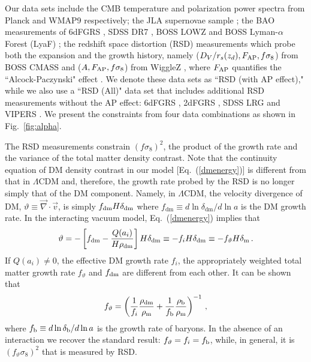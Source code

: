 \documentclass[prd,twocolumn,preprintnumbers,amsmath,amssymb,nofootinbib,english,showpacs]{revtex4-1}
\newcommand{\tc}{\textcolor{black}}
\def\be{\begin{equation}}
\def\ee{\end{equation}}
\begin{document}
Our data sets include the CMB temperature and polarization power spectra from Planck \cite{Planck:2013Mar:cos} and WMAP9 \cite{WMAP9:2012} respectively; the JLA supernovae sample \cite{Sako:2014Jan}; the BAO measurements of 6dFGRS \cite{Beutler:2011Jun}, SDSS DR7 \cite{Padmanabhan:2012Feb}, BOSS LOWZ \cite{Anderson:2013Dec} and BOSS Lyman-$\alpha$ Forest (LyaF) \cite{Aubourg:2014Nov}; the redshift space distortion (RSD) measurements which probe both the expansion and the growth history, namely ($D_V/r_s(z_d), F_{\rm AP}, f\sigma_8$) from BOSS CMASS \cite{Beutler:2013Dec} and ($A, F_{\rm AP}, f\sigma_8$) from WiggleZ \cite{Blake:2012Apr}, where $F_{\rm AP}$ quantifies the ``Alcock-Paczynski" effect \cite{AP}. We denote these data sets as ``RSD (with AP effect)," while we also use a ``RSD (All)" data set that includes additional RSD measurements without the AP effect: 6dFGRS \cite{Beutler:2012Apr}, 2dFGRS \cite{Percival:2004Jun}, SDSS LRG \cite{Samushia:2011Feb} and VIPERS \cite{Torre:2013Mar}. We present the constraints from four data combinations as shown in Fig.~\ref{fig:alpha}.

The RSD measurements constrain $(f\sigma_8)^2$, the product of the growth rate and the variance of the total matter density contrast. Note that the continuity equation of DM density contrast in our model  [Eq.~(\ref{dmenergy})] is different from that in $\Lambda$CDM and, therefore, the growth rate probed by the RSD is no longer simply that of the DM component. Namely, in $\Lambda$CDM, the velocity divergence of DM, $\vartheta\equiv\vec{\nabla}\cdot\vec{v}$, is simply $f_{\rm dm} H\delta_{\mathrm{dm}}$ where $f_{\mathrm{dm}} \equiv d \ln \delta_{\mathrm{dm}} /d \ln a$ is the DM growth rate. In the interacting vacuum model, Eq.~(\ref{dmenergy}) implies that
\be
\nonumber
\vartheta = -\left[f_{\mathrm{dm}}-\frac{Q(a_i)}{H\rho_{\mathrm{dm}}}\right]H\delta_{\mathrm{dm}} \equiv -f_i H\delta_{\mathrm{dm}} \equiv -f_{\vartheta}H\delta_{\rm \tc{m}} \,.
\ee
If $Q(a_i)\neq0$, the effective DM growth rate $f_i$, the appropriately weighted total matter growth rate $f_{\vartheta}$ \cite{BruniWandsinprep} and $f_{\rm dm}$ are different from each other. It can be shown that
\be
\label{eq:fvartheta} f_{\vartheta}=\left( \frac{1}{f_i}\frac{\rho_{\rm \tc{dm}}}{\rho_{\rm \tc{m}}}+\frac{1}{f_{\rm \tc{b}}}\frac{\rho_{\rm \tc{b}}}{\rho_{\rm \tc{m}}}\right)^{-1}\,,
\ee
where $f_{\rm b}\equiv {d \ln \delta_{\rm b}}/{d \ln a}$ is the growth rate of baryons. In the absence of an interaction we recover the standard result: $f_{\vartheta}=f_i=f_{\rm \tc{b}}$, while, in general, it is $(f_{\vartheta}\sigma_8)^2$ that is measured by RSD.
\end{document}

